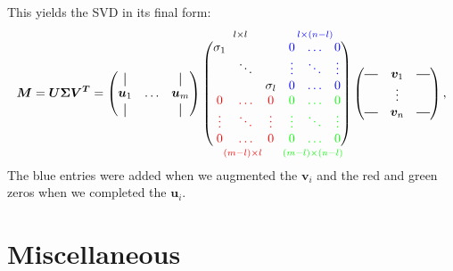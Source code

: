This yields the SVD in its final form:
\begin{align}
    \bm{M} = \bm{U \Sigma V^T} =
        \begin{pmatrix}
        \vertbar &        & \vertbar \\
        \bm{u}_1 & \hdots & \bm{u}_m \\
        \vertbar &        & \vertbar 
    \end{pmatrix}
    \overset{\quad  l \x l \quad \quad \quad\quad \blue{l \x (n-l)}}{
    \underset{\ \ \ \red{(m-l) \x l} \ \ \quad \green{(m-l) \x (n-l)}}{
    \begin{pmatrix}
            \sigma_1 &        &          & \blue{0      } & \blue{\hdots}  &  \blue{0}  \\
                        & \ddots &          & \blue{\vdots } & \blue{\ddots }  & \blue{\vdots }  \\
                        &        & \sigma_l & \blue{0      } & \blue{\hdots }  & \blue{0      }  \\
            \red{0     }   & \red{\hdots} & \red{0     } & \green{0     }  & \green{\hdots} & \green{0} \\
            \red{\vdots}   & \red{\ddots} & \red{\vdots} & \green{\vdots}  & \green{\ddots} & \green{\vdots}   \\
            \red{0     }   & \red{\hdots} & \red{0     } & \green{0     }  & \green{\hdots} & \green{0}
    \end{pmatrix}}}
    \begin{pmatrix}
        \horzbar & \bm{v}_1     & \horzbar \\
                    & \vdots            &          \\
        \horzbar & \bm{v}_n     & \horzbar \\
    \end{pmatrix},
\end{align}
The blue entries were added when we augmented the $\bm{v}_i$ and the red and green zeros when we 
completed the $\bm{u}_i$.


\section{Miscellaneous}
